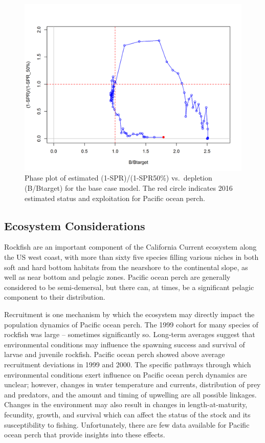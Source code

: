 \documentclass[12pt,]{article}
\begin{document}
\begin{figure}
\centering
\includegraphics{r4ss/plots_mod1/SPR4_phase.png}
\caption{Phase plot of estimated (1-SPR)/(1-SPR50\%) vs.~depletion
(B/Btarget) for the base case model. The red circle indicates 2016
estimated status and exploitation for Pacific ocean perch.
\label{fig:Phase_all}}
\end{figure}

\FloatBarrier

\subsection*{Ecosystem Considerations}\label{ecosystem-considerations}

Rockfish are an important component of the California Current ecosystem
along the US west coast, with more than sixty five species filling
various niches in both soft and hard bottom habitats from the nearshore
to the continental slope, as well as near bottom and pelagic zones.
Pacific ocean perch are generally considered to be semi-demersal, but
there can, at times, be a significant pelagic component to their
distribution.

Recruitment is one mechanism by which the ecosystem may directly impact
the population dynamics of Pacific ocean perch. The 1999 cohort for many
species of rockfish was large -- sometimes significantly so. Long-term
averages suggest that environmental conditions may influence the
spawning success and survival of larvae and juvenile rockfish. Pacific
ocean perch showed above average recruitment deviations in 1999 and
2000. The specific pathways through which environmental conditions exert
influence on Pacific ocean perch dynamics are unclear; however, changes
in water temperature and currents, distribution of prey and predators,
and the amount and timing of upwelling are all possible linkages.
Changes in the environment may also result in changes in
length-at-maturity, fecundity, growth, and survival which can affect the
status of the stock and its susceptibility to fishing. Unfortunately,
there are few data available for Pacific ocean perch that provide
insights into these effects.
\end{document}
